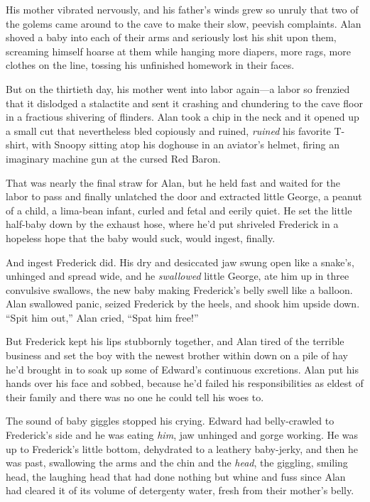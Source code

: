 \documentclass{article}
\begin{document}
His mother vibrated nervously, and his father's winds grew so unruly
that two of the golems came around to the cave to make their slow,
peevish complaints.  Alan shoved a baby into each of their arms and
seriously lost his shit upon them, screaming himself hoarse at them
while hanging more diapers, more rags, more clothes on the line,
tossing his unfinished homework in their faces.

But on the thirtieth day, his mother went into labor again---a labor
so frenzied that it dislodged a stalactite and sent it crashing and
chundering to the cave floor in a fractious shivering of flinders. 
Alan took a chip in the neck and it opened up a small cut that
nevertheless bled copiously and ruined, \textit{ruined} his favorite
T-shirt, with Snoopy sitting atop his doghouse in an aviator's helmet,
firing an imaginary machine gun at the cursed Red Baron.

That was nearly the final straw for Alan, but he held fast and waited
for the labor to pass and finally unlatched the door and extracted
little George, a peanut of a child, a lima-bean infant, curled and
fetal and eerily quiet.  He set the little half-baby down by the
exhaust hose, where he'd put shriveled Frederick in a hopeless hope
that the baby would suck, would ingest, finally.

And ingest Frederick did.  His dry and desiccated jaw swung open like
a snake's, unhinged and spread wide, and he \textit{swallowed} little
George, ate him up in three convulsive swallows, the new baby making
Frederick's belly swell like a balloon.  Alan swallowed panic, seized
Frederick by the heels, and shook him upside down.  ``Spit him out,''
Alan cried, ``Spat him free!''

But Frederick kept his lips stubbornly together, and Alan tired of the
terrible business and set the boy with the newest brother within down
on a pile of hay he'd brought in to soak up some of Edward's
continuous excretions.  Alan put his hands over his face and sobbed,
because he'd failed his responsibilities as eldest of their family and
there was no one he could tell his woes to.

The sound of baby giggles stopped his crying.  Edward had
belly-crawled to Frederick's side and he was eating \textit{him}, jaw
unhinged and gorge working.  He was up to Frederick's little bottom,
dehydrated to a leathery baby-jerky, and then he was past, swallowing
the arms and the chin and the \textit{head}, the giggling, smiling
head, the laughing head that had done nothing but whine and fuss since
Alan had cleared it of its volume of detergenty water, fresh from
their mother's belly.
\end{document}
